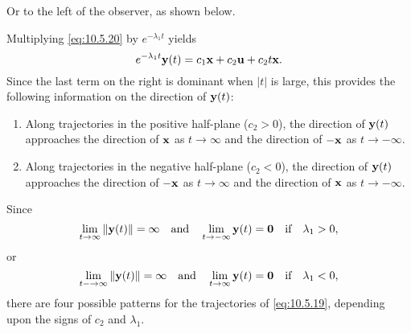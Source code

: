 \documentclass{ximera}
\begin{document}



Or to the left of the observer, as shown below.

\begin{center}
\end{center}

\begin{center}
\end{center}



Multiplying \eqref{eq:10.5.20} by $e^{-\lambda_1t}$ yields
$$
e^{-\lambda_1t}{\bf y}(t)=c_1{\bf x}+c_2{\bf u}+c_2t
{\bf x}.
$$
Since the last term on the right is dominant when $|t|$ is large,
this provides the following information on the direction of ${\bf
y}(t)$:
\begin{enumerate}
\item %
Along trajectories in the positive half-plane ($c_2>0$), the direction
of ${\bf y}(t)$ approaches the direction of ${\bf x}$ as $t\rightarrow\infty$
and the direction of $-{\bf x}$ as $t\rightarrow-\infty$.
\item %
Along trajectories in the negative half-plane ($c_2<0$), the direction
of ${\bf y}(t)$ approaches the direction of $-{\bf x}$ as $t\rightarrow\infty$
and the direction of ${\bf x}$ as $t\rightarrow-\infty$.
\end{enumerate}

Since
$$
\lim_{t\rightarrow\infty}\|{\bf y}(t)\|=\infty\quad\mbox{and}\quad
\lim_{t\rightarrow-\infty}{\bf y}(t)={\bf 0}\quad\mbox{if}\quad\lambda_1>0,
$$
or
$$
\lim_{t-\rightarrow\infty}\|{\bf y}(t)\|=\infty\quad\mbox{and}\quad
\lim_{t\rightarrow\infty}{\bf y}(t)={\bf 0}\quad\mbox{if}\quad\lambda_1<0,
$$
 there are four possible patterns for the trajectories
of \eqref{eq:10.5.19}, depending upon the signs of $c_2$ and $\lambda_1$.

\end{document}
